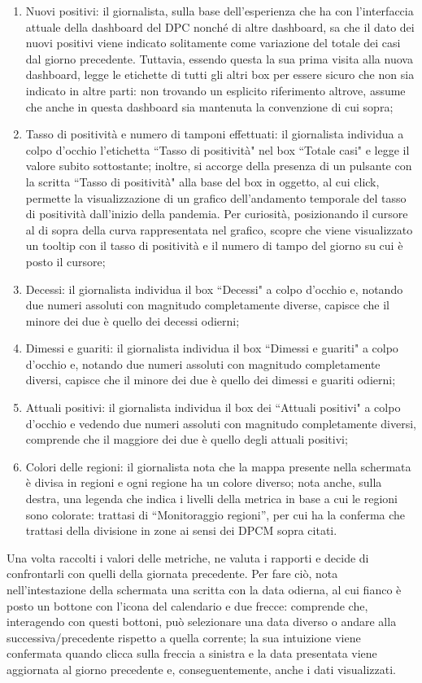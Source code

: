 \begin{enumerate}
    \item Nuovi positivi: il giornalista, sulla base dell'esperienza che ha con l'interfaccia attuale della dashboard del DPC nonché di altre dashboard, sa che il dato dei nuovi positivi viene indicato solitamente come variazione del totale dei casi dal giorno precedente. Tuttavia, essendo questa la sua prima visita alla nuova dashboard, legge le etichette di tutti gli altri box per essere sicuro che non sia indicato in altre parti: non trovando un esplicito riferimento altrove, assume che anche in questa dashboard sia mantenuta la convenzione di cui sopra;
    \item Tasso di positività e numero di tamponi effettuati: il giornalista individua a colpo d'occhio l'etichetta ``Tasso di positività" nel box ``Totale casi" e legge il valore subito sottostante; inoltre, si accorge della presenza di un pulsante con la scritta ``Tasso di positività" alla base del box in oggetto, al cui click, permette la visualizzazione di un grafico dell'andamento temporale del tasso di positività dall'inizio della pandemia. Per curiosità, posizionando il cursore al di sopra della curva rappresentata nel grafico, scopre che viene visualizzato un tooltip con il tasso di positività e il numero di tampo del giorno su cui è posto il cursore;
    \item Decessi: il giornalista individua il box ``Decessi" a colpo d'occhio e, notando due numeri assoluti con magnitudo completamente diverse, capisce che il minore dei due è quello dei decessi odierni;
    \item Dimessi e guariti: il giornalista individua il box ``Dimessi e guariti" a colpo d'occhio e, notando due numeri assoluti con magnitudo completamente diversi, capisce che il minore dei due è quello dei dimessi e guariti odierni;
    \item Attuali positivi: il giornalista individua il box dei ``Attuali positivi" a colpo d'occhio e vedendo due numeri assoluti con magnitudo completamente diversi, comprende che il maggiore dei due è quello degli attuali positivi;
    \item Colori delle regioni: il giornalista nota che la mappa presente nella schermata è divisa in regioni e ogni regione ha un colore diverso; nota anche, sulla destra, una legenda che indica i livelli della metrica in base a cui le regioni sono colorate: trattasi di ``Monitoraggio regioni'', per cui ha la conferma che trattasi della divisione in zone ai sensi dei DPCM sopra citati. \label{cw1:f}
\end{enumerate}
Una volta raccolti i valori delle metriche, ne valuta i rapporti e decide di confrontarli con quelli della giornata precedente. Per fare ciò, nota nell'intestazione della schermata una scritta con la data odierna, al cui fianco è posto un bottone con l'icona del calendario e due frecce: comprende che, interagendo con questi bottoni, può selezionare una data diverso o andare alla successiva/precedente rispetto a quella corrente; la sua intuizione viene confermata quando clicca sulla freccia a sinistra e la data presentata viene aggiornata al giorno precedente e, conseguentemente, anche i dati visualizzati.

